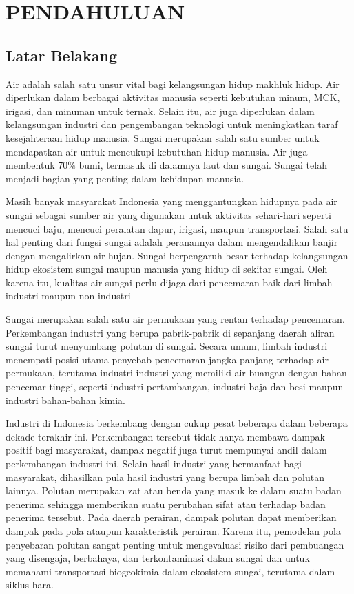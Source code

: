 \chapter{PENDAHULUAN}

\section{Latar Belakang}
Air adalah salah satu unsur vital bagi kelangsungan hidup makhluk hidup. Air diperlukan dalam berbagai aktivitas manusia seperti kebutuhan minum, MCK, irigasi, dan minuman untuk ternak. Selain itu, air juga diperlukan dalam kelangsungan industri dan pengembangan teknologi untuk meningkatkan taraf kesejahteraan hidup manusia. Sungai merupakan salah satu sumber untuk mendapatkan air untuk mencukupi kebutuhan hidup manusia. Air juga membentuk 70$\%$ bumi, termasuk di dalamnya laut dan sungai. Sungai telah menjadi bagian yang penting dalam kehidupan manusia.

Masih banyak masyarakat Indonesia yang menggantungkan hidupnya pada air sungai sebagai sumber air yang digunakan untuk aktivitas sehari-hari seperti mencuci baju, mencuci peralatan dapur, irigasi, maupun transportasi. Salah satu hal penting dari fungsi sungai adalah peranannya dalam mengendalikan banjir dengan mengalirkan air hujan. Sungai berpengaruh besar terhadap kelangsungan hidup ekosistem sungai maupun manusia yang hidup di sekitar sungai. Oleh karena itu, kualitas air sungai perlu dijaga dari pencemaran baik dari limbah industri maupun non-industri~\citep{Ver}

Sungai merupakan salah satu air permukaan yang rentan terhadap pencemaran. Perkembangan industri yang berupa pabrik-pabrik di sepanjang daerah aliran sungai turut menyumbang polutan di sungai. Secara umum, limbah industri menempati posisi utama penyebab pencemaran jangka panjang terhadap air permukaan, terutama industri-industri yang memiliki air buangan dengan bahan pencemar tinggi, seperti industri pertambangan, industri baja dan besi maupun industri bahan-bahan kimia.

Industri di Indonesia berkembang dengan cukup pesat beberapa dalam beberapa dekade terakhir ini. Perkembangan tersebut tidak hanya membawa dampak positif bagi masyarakat, dampak negatif juga turut mempunyai andil dalam perkembangan industri ini. Selain hasil industri yang bermanfaat bagi masyarakat, dihasilkan pula hasil industri yang berupa limbah dan polutan lainnya. Polutan merupakan zat atau benda yang masuk ke dalam suatu badan penerima sehingga memberikan suatu perubahan sifat atau terhadap badan penerima tersebut. Pada daerah perairan, dampak polutan dapat memberikan dampak pada pola ataupun karakteristik perairan. Karena itu, pemodelan pola penyebaran polutan sangat penting untuk mengevaluasi risiko dari pembuangan yang disengaja, berbahaya, dan terkontaminasi dalam sungai dan untuk memahami transportasi biogeokimia dalam ekosistem sungai, terutama dalam siklus hara.

